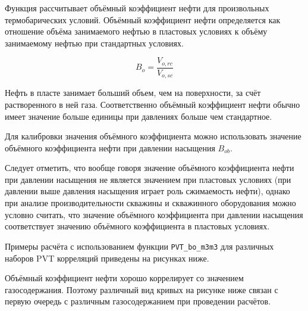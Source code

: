 Функция рассчитывает объёмный коэффициент нефти для произвольных термобарических условий. 
Объёмный коэффициент нефти определяется как отношение объёма занимаемого нефтью в пластовых условиях к объёму занимаемому нефтью при стандартных условиях. 

$$B_o = \frac{V_{o,rc}}{V_{o,sc}}$$

Нефть в пласте занимает больший объем, чем на поверхности, за счёт растворенного в ней газа. Соответственно объёмный коэффициент нефти обычно имеет значение больше единицы при давлениях больше чем стандартное.

Для калибровки значения объёмного коэффициента можно использовать значение объёмного коэффициента нефти при давлении насыщения $B_{ob}$. 

Следует отметить, что вообще говоря значение объёмного коэффициента нефти при давлении насыщения не является значением при пластовых условиях (при давлении выше давления насыщения играет роль сжимаемость нефти), однако при анализе производительности скважины и скважинного оборудования можно условно считать, что значение объёмного коэффициента при давлении насыщения соответствует значению  объёмного коэффициента в пластовых условиях.  


Примеры расчёта с использованием функции \texttt{PVT_bo_m3m3} для различных наборов PVT корреляций приведены на рисунках ниже.

Объёмный коэффициент нефти хорошо коррелирует со значением газосодержания. Поэтому различный вид кривых на рисунке ниже связан с первую очередь с различным газосодержанием при проведении расчётов.

\newcommand{\BoDataFile}{data/Bo_P_data.txt}

